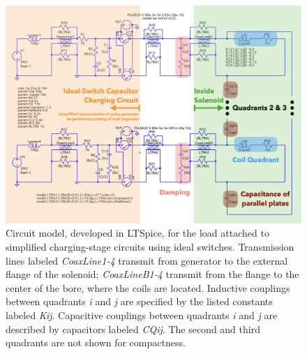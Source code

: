 \begin{refsection}
        \begin{figure}
            \centering
            \includegraphics[width=\textwidth]{Figures/muEDM/Pulser/PulserModelJan2024.png}
            \caption{Circuit model, developed in LTSpice, for the load attached to simplified charging-stage circuits using ideal switches. Transmission lines labeled \textit{CoaxLine1-4} transmit from generator to the external flange of the solenoid; \textit{CoaxLineB1-4} transmit from the flange to the center of the bore, where the coils are located. Inductive couplings between quadrants \textit{i} and \textit{j} are specified by the listed constants labeled \textit{Kij}. Capacitive couplings between quadrants \textit{i} and \textit{j} are described by capacitors labeled \textit{CQij}. The second and third quadrants are not shown for compactness.}
        \label{fig:circuit}
        \end{figure}
        

\end{refsection}
